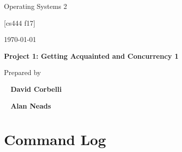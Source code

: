 \documentclass[letterpaper,10pt]{article}
\def \GroupMemberOne{			David Corbelli}
\def \GroupMemberTwo{			Alan Neads}
\def \ProjectName{		Project 1: Getting Acquainted and Concurrency 1}
\begin{document}
\begin{titlepage}
    
        \hfill 
        \par\vspace{.2in}
        \centering
        \scshape{
            \Huge Operating Systems 2  \par
           	\Huge [cs444 f17] \par
            {\large\today}\par
            \vspace{.5in}
            \textbf{\Huge\ProjectName}\par
            \vspace{.5in}
           
            {\large Prepared by }\par
           
   
            \vspace{5pt}
            \textbf{\Huge\ \GroupMemberOne}\par
            }
            \textbf{\Huge\ \GroupMemberTwo}\par
            \vspace{60pt}
         
        
    
\end{titlepage}
\newpage
\tableofcontents


\newpage
\section{Command Log}

\newpage
\end{document}
